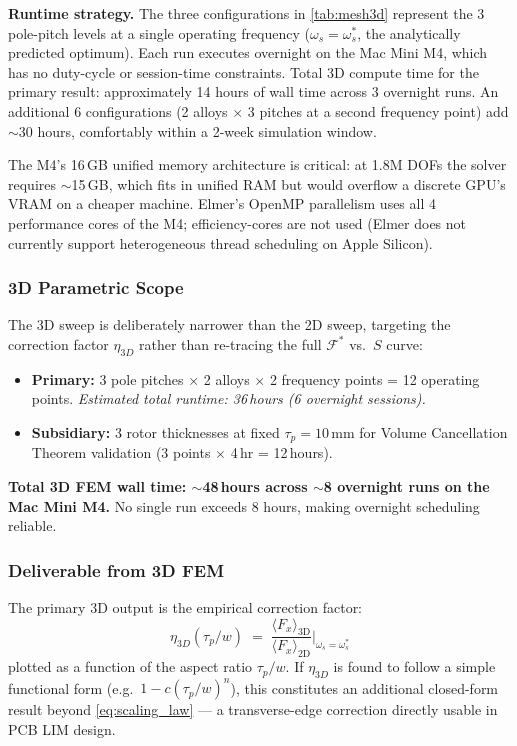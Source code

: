 \documentclass[12pt,letterpaper]{article}
\begin{document}
\noindent\textbf{Runtime strategy.} The three configurations in \cref{tab:mesh3d}
represent the 3 pole-pitch levels at a single operating frequency
($\omega_s = \omega_s^*$, the analytically predicted optimum). Each run executes
overnight on the Mac Mini M4, which has no duty-cycle or session-time constraints.
Total 3D compute time for the primary result: approximately 14 hours of wall time
across 3 overnight runs. An additional 6 configurations (2 alloys $\times$ 3 pitches
at a second frequency point) add $\sim$30 hours, comfortably within a 2-week
simulation window.

The M4's 16\,GB unified memory architecture is critical: at 1.8M DOFs the solver
requires $\sim$15\,GB, which fits in unified RAM but would overflow a discrete GPU's
VRAM on a cheaper machine. Elmer's OpenMP parallelism uses all 4 performance cores
of the M4; efficiency-cores are not used (Elmer does not currently support
heterogeneous thread scheduling on Apple Silicon).

\subsubsection{3D Parametric Scope}

The 3D sweep is deliberately narrower than the 2D sweep, targeting the correction
factor $\eta_{3D}$ rather than re-tracing the full $\mathcal{F}^*$ vs.\ $S$ curve:

\begin{itemize}[noitemsep]
  \item \textbf{Primary:} 3 pole pitches $\times$ 2 alloys $\times$ 2 frequency
    points = 12 operating points. \textit{Estimated total runtime: 36\,hours (6 overnight sessions).}
  \item \textbf{Subsidiary:} 3 rotor thicknesses at fixed $\tau_p = 10$\,mm for
    Volume Cancellation Theorem validation (3 points $\times$ 4\,hr = 12\,hours).
\end{itemize}

\textbf{Total 3D FEM wall time: $\sim$48\,hours across $\sim$8 overnight runs on the
Mac Mini M4.} No single run exceeds 8 hours, making overnight scheduling reliable.

\subsubsection{Deliverable from 3D FEM}

The primary 3D output is the empirical correction factor:
\begin{equation}
  \eta_{3D}(\tau_p/w) \;=\;
  \frac{\langle F_x\rangle_{\mathrm{3D}}}{\langle F_x\rangle_{\mathrm{2D}}}
  \Bigg|_{\omega_s = \omega_s^*}
  \label{eq:eta3d}
\end{equation}
plotted as a function of the aspect ratio $\tau_p/w$. If $\eta_{3D}$ is found to
follow a simple functional form (e.g.\ $1 - c(\tau_p/w)^n$), this constitutes an
additional closed-form result beyond \cref{eq:scaling_law} — a transverse-edge
correction directly usable in PCB LIM design.
\end{document}
